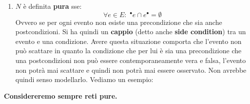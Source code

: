 \documentclass[a4paper,12pt, oneside]{book}
\begin{document}
\begin{definizione}
\begin{enumerate}
\begin{center}
    \end{center}
    \item $N$ è definita \textbf{pura} sse:
    \[\forall e \in E:\,\,^\bullet e \cap e^\bullet = \emptyset\]
    Ovvero se per ogni evento non esiste una precondizione che sia anche
    postcondizioni. Si ha quindi un \textbf{cappio} (detto anche \textbf{side
      condition}) tra un evento e una condizione. Avere questa situazione
    comporta che l'evento non può scattare in quanto la condizione che per lui è
    sia una precondizione che una postcondizioni non può essere
    contemporaneamente vera e falsa, l'evento non potrà mai scattare e quindi
    non potrà mai essere osservato. Non avrebbe quindi senso modellarlo. Vediamo
    un esempio:
    \begin{center}
  \end{center}
    
  \end{enumerate}
\end{definizione}
\textbf{Considereremo sempre reti pure.}\\
\end{document}
